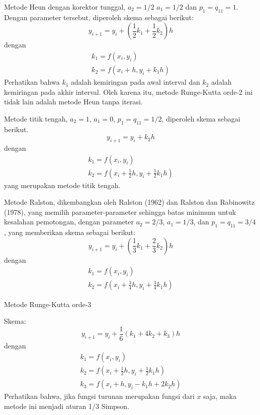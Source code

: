 Metode Heun dengan korektor tunggal, $a_2 = 1/2$
$a_1 = 1/2$ dan $p_1 = q_{11} = 1$. Dengan parameter tersebut, diperoleh skema
sebagai berikut:
\begin{equation*}
y_{i+1} = y_{i} + \left(
\frac{1}{2}k_1 + \frac{1}{2}k_2
\right)h
\end{equation*}
dengan
\begin{align*}
k_1 = f(x_i, y_i) \\
k_2 = f(x_i + h, y_i + k_1 h)
\end{align*}
Perhatikan bahwa $k_1$ adalah kemiringan pada awal interval dan $k_2$ adalah
kemiringan pada akhir interval. Oleh karena itu, metode Runge-Kutta orde-2 ini
tidak lain adalah metode Heun tanpa iterasi.


Metode titik tengah, $a_2 = 1$, $a_1 = 0$, $p_1 = q_{11} = 1/2$, diperoleh
skema sebagai berikut.
\begin{equation*}
y_{i+1} = y_i + k_2 h
\end{equation*}
dengan
\begin{align*}
k_1 = f(x_i, y_i) \\
k_2 = f\left( x_i + \frac{1}{2}h, y_i + \frac{1}{2} k_1 h \right)
\end{align*}
yang merupakan metode titik tengah.

Metode Ralston, dikembangkan oleh Ralston (1962) dan Ralston dan Rabinowitz (1978),
yang memilih parameter-parameter sehingga batas minimum untuk kesalahan pemotongan,
dengan parameter $a_2 = 2/3$, $a_1 = 1/3$, dan $p_1 = q_{11} = 3/4$, yang
memberikan skema sebagai berikut:
\begin{equation*}
y_{i+1} = y_i + \left( \frac{1}{3}k_1 + \frac{2}{3}k_2 \right) h
\end{equation*}
dengan
\begin{align*}
k_1 = f(x_i, y_i) \\
k_2 = f\left( x_i + \frac{3}{4}h, y_i + \frac{3}{4}k_1 h \right)
\end{align*}


Metode Runge-Kutta orde-3

Skema:
\begin{equation*}
y_{i+1} = y_i + \frac{1}{6}(k_1 + 4k_2 + k_3)h
\end{equation*}
dengan
\begin{align*}
k_1 = f(x_i, y_i) \\
k_2 = f(x_i + \frac{1}{2}h, y_i + \frac{1}{2} k_1 h ) \\
k_3 = f(x_i + h, y_i - k_1 h + 2 k_2 h)
\end{align*}
Perhatikan bahwa, jika fungsi turunan merupakan fungsi dari $x$ saja, maka metode ini menjadi
aturan 1/3 Simpson.

